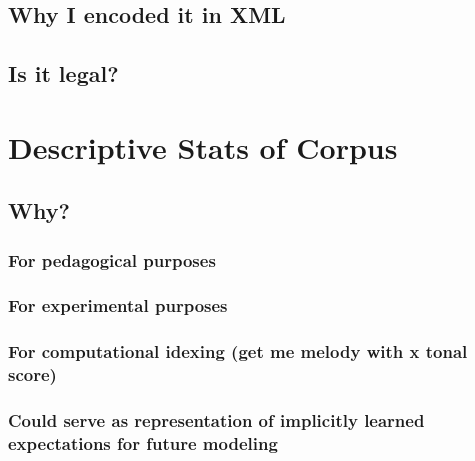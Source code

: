 \documentclass[]{book}
\theoremstyle{definition}
\theoremstyle{definition}
\theoremstyle{definition}
\theoremstyle{remark}
\begin{document}
\hypertarget{why-i-encoded-it-in-xml}{%
\subsection{Why I encoded it in XML}\label{why-i-encoded-it-in-xml}}

\hypertarget{is-it-legal}{%
\subsection{Is it legal?}\label{is-it-legal}}

\hypertarget{descriptive-stats-of-corpus}{%
\section{Descriptive Stats of
Corpus}\label{descriptive-stats-of-corpus}}

\hypertarget{why}{%
\subsection{Why?}\label{why}}

\hypertarget{for-pedagogical-purposes}{%
\subsubsection{For pedagogical
purposes}\label{for-pedagogical-purposes}}

\hypertarget{for-experimental-purposes}{%
\subsubsection{For experimental
purposes}\label{for-experimental-purposes}}

\hypertarget{for-computational-idexing-get-me-melody-with-x-tonal-score}{%
\subsubsection{For computational idexing (get me melody with x tonal
score)}\label{for-computational-idexing-get-me-melody-with-x-tonal-score}}

\hypertarget{could-serve-as-representation-of-implicitly-learned-expectations-for-future-modeling}{%
\subsubsection{Could serve as representation of implicitly learned
expectations for future
modeling}\label{could-serve-as-representation-of-implicitly-learned-expectations-for-future-modeling}}
\end{document}
